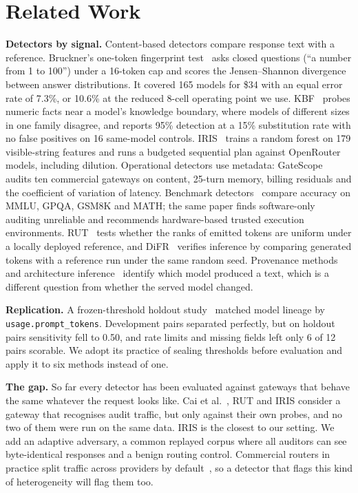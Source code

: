 \section{Related Work}\label{sec:related}
\textbf{Detectors by signal.} Content-based detectors compare response text with a reference. Bruckner's
one-token fingerprint test~\cite{bruckner2026} asks closed questions (``a number
from 1 to 100'') under a 16-token cap and scores the Jensen--Shannon
divergence between answer distributions. It covered 165 models for \$34 with an equal error rate
of 7.3\%, or 10.6\% at the reduced 8-cell operating point we use. KBF~\cite{fang2026kbf} probes
numeric facts near a model's knowledge boundary, where models of different sizes in one family
disagree, and reports 95\% detection at a 15\% substitution rate with no false positives on 16
same-model controls.
IRIS~\cite{iris2026} trains a random forest on 179 visible-string features and runs a budgeted
sequential plan against OpenRouter models, including dilution. Operational detectors use
metadata: GateScope~\cite{lin2026gatescope} audits ten commercial gateways on content, 25-turn
memory, billing residuals and the coefficient of variation of latency. Benchmark
detectors~\cite{cai2025} compare accuracy on MMLU, GPQA, GSM8K and MATH; the same paper finds
software-only auditing unreliable and recommends hardware-based trusted execution environments.
RUT~\cite{zhu2025rut} tests whether the ranks of emitted tokens are uniform under a locally
deployed reference, and DiFR~\cite{difr2025} verifies inference by comparing generated tokens with a
reference run under the same random seed. Provenance methods~\cite{stemma2026} and architecture
inference~\cite{archinfer2026} identify which model produced a text, which is a different question from whether the served model changed.

\textbf{Replication.} A frozen-threshold holdout study~\cite{holdout2026} matched model lineage by
\texttt{usage.prompt\_tokens}. Development pairs separated perfectly, but on holdout pairs
sensitivity fell to 0.50, and rate limits and missing fields left only 6 of 12 pairs scorable. We
adopt its practice of sealing thresholds before evaluation and apply it to six methods instead of
one.

\textbf{The gap.} So far every detector has been evaluated against gateways that behave the same
whatever the request looks like. Cai et al.~\cite{cai2025}, RUT and IRIS consider a gateway that recognises audit
traffic, but only against their own probes, and no two of them were run on the same data. IRIS is the closest to our setting.
We add an adaptive adversary, a common replayed corpus where all auditors can see
byte-identical responses and a benign routing control. Commercial routers in practice split
traffic across providers by default~\cite{openrouter_exacto}, so a detector that flags this
kind of heterogeneity will flag them too.
